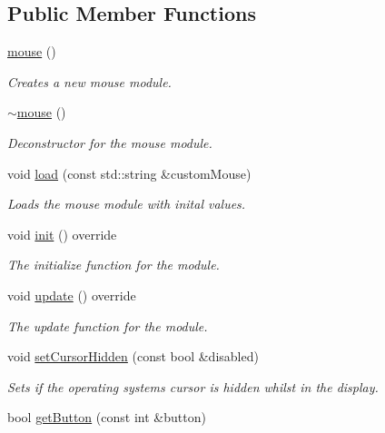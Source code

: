 \subsection*{Public Member Functions}
\begin{DoxyCompactItemize}
\item 
\hyperlink{classflounder_1_1mouse_a60e59355a55844e8ca559e2f6b9c82e9}{mouse} ()
\begin{DoxyCompactList}\small\item\em Creates a new mouse module. \end{DoxyCompactList}\item 
\hyperlink{classflounder_1_1mouse_a3038f39f358e37d15059af6c1675497b}{$\sim$mouse} ()
\begin{DoxyCompactList}\small\item\em Deconstructor for the mouse module. \end{DoxyCompactList}\item 
void \hyperlink{classflounder_1_1mouse_af88cf24fffafeb3e6ed1db19ec40698c}{load} (const std\+::string \&custom\+Mouse)
\begin{DoxyCompactList}\small\item\em Loads the mouse module with inital values. \end{DoxyCompactList}\item 
void \hyperlink{classflounder_1_1mouse_a8a550ad472e61ed74ca42c07777bdd1f}{init} () override
\begin{DoxyCompactList}\small\item\em The initialize function for the module. \end{DoxyCompactList}\item 
void \hyperlink{classflounder_1_1mouse_aa1b1d60e1d1cf4ec7d19eaef65e040bc}{update} () override
\begin{DoxyCompactList}\small\item\em The update function for the module. \end{DoxyCompactList}\item 
void \hyperlink{classflounder_1_1mouse_aff9750c7d68e93aea4c2d3c447677a9e}{set\+Cursor\+Hidden} (const bool \&disabled)
\begin{DoxyCompactList}\small\item\em Sets if the operating systems cursor is hidden whilst in the display. \end{DoxyCompactList}\item 
bool \hyperlink{classflounder_1_1mouse_a327552b319742adbb721733510f8a828}{get\+Button} (const int \&button)

\end{DoxyCompactItemize}
